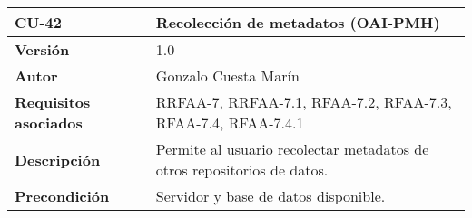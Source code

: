 \begin{longtable}[]{@{}ll@{}}
\toprule
\begin{minipage}[b]{0.19\columnwidth}\raggedright
\textbf{CU-42}\strut
\end{minipage} & \begin{minipage}[b]{0.75\columnwidth}\raggedright
\textbf{Recolección de metadatos (OAI-PMH)}\strut
\end{minipage}\tabularnewline
\midrule
\endhead
\begin{minipage}[t]{0.19\columnwidth}\raggedright
\textbf{Versión}\strut
\end{minipage} & \begin{minipage}[t]{0.75\columnwidth}\raggedright
1.0\strut
\end{minipage}\tabularnewline
\begin{minipage}[t]{0.19\columnwidth}\raggedright
\textbf{Autor}\strut
\end{minipage} & \begin{minipage}[t]{0.75\columnwidth}\raggedright
Gonzalo Cuesta Marín\strut
\end{minipage}\tabularnewline
\begin{minipage}[t]{0.19\columnwidth}\raggedright
\textbf{Requisitos asociados}\strut
\end{minipage} & \begin{minipage}[t]{0.75\columnwidth}\raggedright
RRFAA-7, RRFAA-7.1, RFAA-7.2, RFAA-7.3, RFAA-7.4, RFAA-7.4.1\strut
\end{minipage}\tabularnewline
\begin{minipage}[t]{0.19\columnwidth}\raggedright
\textbf{Descripción}\strut
\end{minipage} & \begin{minipage}[t]{0.75\columnwidth}\raggedright
Permite al usuario recolectar metadatos de otros repositorios de
datos.\strut
\end{minipage}\tabularnewline
\begin{minipage}[t]{0.19\columnwidth}\raggedright
\textbf{Precondición}\strut
\end{minipage} & \begin{minipage}[t]{0.75\columnwidth}\raggedright
Servidor y base de datos disponible.


\end{minipage}
\end{longtable}
